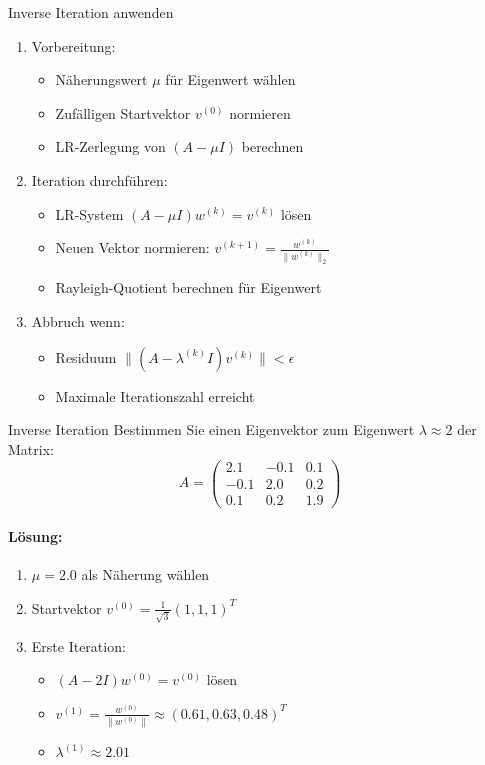 \begin{KR}{Inverse Iteration anwenden}
\begin{enumerate}
    \item Vorbereitung:
    \begin{itemize}
        \item Näherungswert $\mu$ für Eigenwert wählen
        \item Zufälligen Startvektor $v^{(0)}$ normieren 
        \item LR-Zerlegung von $(A-\mu I)$ berechnen
    \end{itemize}
    
    \item Iteration durchführen:
    \begin{itemize}
        \item LR-System $(A-\mu I)w^{(k)} = v^{(k)}$ lösen
        \item Neuen Vektor normieren: $v^{(k+1)} = \frac{w^{(k)}}{\|w^{(k)}\|_2}$
        \item Rayleigh-Quotient berechnen für Eigenwert
    \end{itemize}
    
    \item Abbruch wenn:
    \begin{itemize}
        \item Residuum $\|(A-\lambda^{(k)}I)v^{(k)}\| < \epsilon$
        \item Maximale Iterationszahl erreicht
    \end{itemize}
\end{enumerate}
\end{KR}

\begin{example2}{Inverse Iteration}
Bestimmen Sie einen Eigenvektor zum Eigenwert $\lambda \approx 2$ der Matrix:
$$A = \begin{pmatrix}
2.1 & -0.1 & 0.1 \\
-0.1 & 2.0 & 0.2 \\
0.1 & 0.2 & 1.9
\end{pmatrix}$$

\paragraph{Lösung:}
\begin{enumerate}
    \item $\mu = 2.0$ als Näherung wählen
    \item Startvektor $v^{(0)} = \frac{1}{\sqrt{3}}(1,1,1)^T$
    \item Erste Iteration:
    \begin{itemize}
        \item $(A-2I)w^{(0)} = v^{(0)}$ lösen
        \item $v^{(1)} = \frac{w^{(0)}}{\|w^{(0)}\|} \approx (0.61, 0.63, 0.48)^T$
        \item $\lambda^{(1)} \approx 2.01$
    \end{itemize}
\end{enumerate}
\end{example2}

